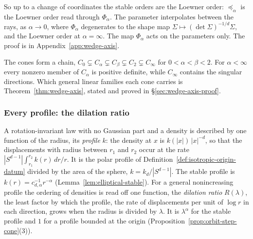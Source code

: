 So up to a change of coordinates the stable orders are the Loewner order: $\preceq_\alpha$ is the
Loewner order read through $\Phi_\alpha$. The parameter interpolates between the rays, as $\alpha \to 0$,
where $\Phi_\alpha$ degenerates to the shape map $\Sigma \mapsto (\det\Sigma)^{-1/d}\Sigma$, and the
Loewner order at $\alpha = \infty$. The map $\Phi_\alpha$ acts on the parameters only.
The proof is in Appendix~\ref{app:wedge-axis}.


The cones form a chain, $C_0 \subsetneq C_\alpha \subsetneq C_\beta \subsetneq C_2 \subsetneq C_\infty$
for $0 < \alpha < \beta < 2$. For $\alpha < \infty$ every nonzero member of $C_\alpha$ is positive
definite, while $C_\infty$ contains the singular directions. Which general linear families each cone
carries is Theorem~\ref{thm:wedge-axis}, stated and proved in
\S\ref{sec:wedge-axis-proof}.

\subsubsection*{Every profile: the dilation ratio}

A rotation-invariant law with no Gaussian part and a \Levy{} density is described by one function of
the radius, its \emph{profile} $k$: the \Levy{} density at $x$ is $k(|x|)\,|x|^{-d}$, so that the
displacements with radius between $r_1$ and $r_2$ occur at the rate
$|S^{d-1}|\int_{r_1}^{r_2}k(r)\,dr/r$. It is the polar profile of
Definition~\ref{def:isotropic-origin-datum} divided by the area of the sphere, $k = k_d/|S^{d-1}|$. The
stable profile is $k(r) = c_{d,\alpha}^{-1}r^{-\alpha}$ (Lemma~\ref{lem:elliptical-stable}). For a
general nonincreasing profile the ordering of \Levy{} densities is read off one function, the
\emph{dilation ratio} $R(\lambda)$, the least factor by which the profile, the rate of displacements per
unit of $\log r$ in each direction, grows when the radius is divided by $\lambda$. It is $\lambda^\alpha$ for the stable profile and $1$ for a
profile bounded at the origin (Proposition~\ref{prop:orbit-step-cone}(3)).

